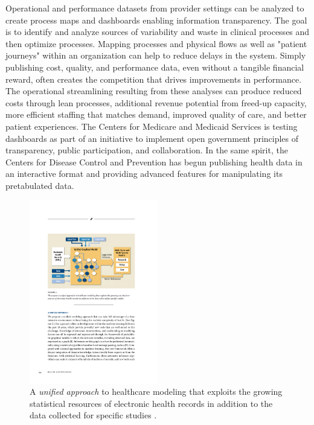 \documentclass[twocolumn]{article}
\begin{document}
Operational and performance datasets from provider settings can be analyzed to create process maps and dashboards enabling information transparency. The goal is to identify and analyze sources of variability and waste in clinical processes and then optimize processes. Mapping processes and physical flows as well as "patient journeys" within an organization can help to reduce delays in the system. Simply publishing cost, quality, and performance data, even without a tangible financial reward, often creates the competition that drives improvements in performance. The operational streamlining resulting from these analyses can produce reduced costs through lean processes, additional revenue potential from freed-up capacity, more efficient staffing that matches demand, improved quality of care, and better patient experiences. The Centers for Medicare and Medicaid Services is testing dashboards as part of an initiative to implement open government principles of transparency, public participation, and collaboration. In the same spirit, the Centers for Disease Control and Prevention has begun publishing health data in an interactive format and providing advanced features for manipulating its pretabulated data.

\begin{figure}[htb]
        \centering
        \includegraphics[width=0.5\textwidth]{model.pdf}
        \caption{A \textit{unified approach} to healthcare modeling that exploits the growing statistical resources of electronic health records in addition to the data collected for specific studies \cite{Hey:2009}.}
        \label{fig:model}
\end{figure}
\end{document}
